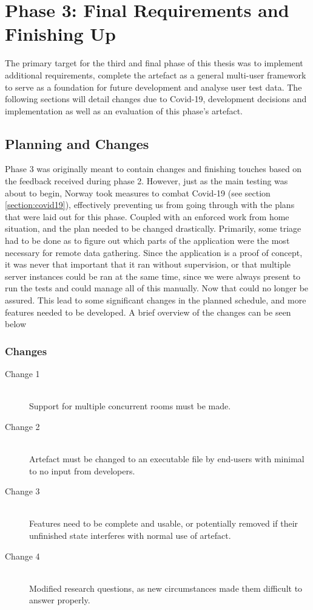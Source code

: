 
\chapter{Phase 3: Final Requirements and Finishing Up} 
\label{chap:7}
\label{chap:phase3}
The primary target for the third and final phase of this thesis was to implement additional requirements, complete the artefact as a general multi-user framework to serve as a foundation for future development and analyse user test data. The following sections will detail changes due to Covid-19, development decisions and implementation as well as an evaluation of this phase's artefact.                 


\section{Planning and Changes}
Phase 3 was originally meant to contain changes and finishing touches based on the feedback received during phase 2. However, just as the main testing was about to begin, Norway took measures to combat Covid-19 (see section \ref{section:covid19}), effectively preventing us from going through with the plans that were laid out for this phase. Coupled with an enforced work from home situation, and the plan needed to be changed drastically. Primarily, some triage had to be done as to figure out which parts of the application were the most necessary for remote data gathering. Since the application is a proof of concept, it was never that important that it ran without supervision, or that multiple server instances could be ran at the same time, since we were always present to run the tests and could manage all of this manually. Now that could no longer be assured. This lead to some significant changes in the planned schedule, and more features needed to be developed. A brief overview of the changes can be seen below

\subsection{Changes}
\begin{description}
    \item [Change 1]\hfill \\
    Support for multiple concurrent rooms must be made. 
    \item [Change 2]\hfill \\
    Artefact must be changed to an executable file by end-users with minimal to no input from developers.
    \item [Change 3]\hfill \\
    Features need to be complete and usable, or potentially removed if their unfinished state interferes with normal use of artefact.
    \item[Change 4]\hfill \\
    Modified research questions, as new circumstances made them difficult to answer properly.
\end{description}

